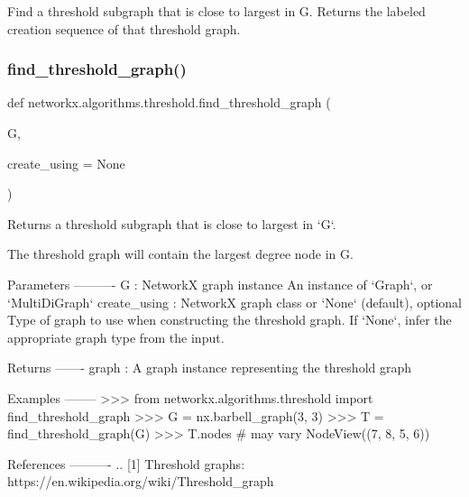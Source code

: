 \begin{DoxyVerb}Find a threshold subgraph that is close to largest in G.
Returns the labeled creation sequence of that threshold graph.
\end{DoxyVerb}
 \mbox{\label{namespacenetworkx_1_1algorithms_1_1threshold_a442c5310f0de219f71300e356723bb74}} 
\subsubsection{\texorpdfstring{find\+\_\+threshold\+\_\+graph()}{find\_threshold\_graph()}}
{\footnotesize\ttfamily def networkx.\+algorithms.\+threshold.\+find\+\_\+threshold\+\_\+graph (\begin{DoxyParamCaption}\item[{}]{G,  }\item[{}]{create\+\_\+using = {\ttfamily None} }\end{DoxyParamCaption})}

\begin{DoxyVerb}Returns a threshold subgraph that is close to largest in `G`.

The threshold graph will contain the largest degree node in G.

Parameters
----------
G : NetworkX graph instance
    An instance of `Graph`, or `MultiDiGraph`
create_using : NetworkX graph class or `None` (default), optional
    Type of graph to use when constructing the threshold graph.
    If `None`, infer the appropriate graph type from the input.

Returns
-------
graph :
    A graph instance representing the threshold graph

Examples
--------
>>> from networkx.algorithms.threshold import find_threshold_graph
>>> G = nx.barbell_graph(3, 3)
>>> T = find_threshold_graph(G)
>>> T.nodes # may vary
NodeView((7, 8, 5, 6))

References
----------
.. [1] Threshold graphs: https://en.wikipedia.org/wiki/Threshold_graph
\end{DoxyVerb}
 \mbox{\label{namespacenetworkx_1_1algorithms_1_1threshold_a473d58bddd35b77a537dcd6f8007d6d6}} 
